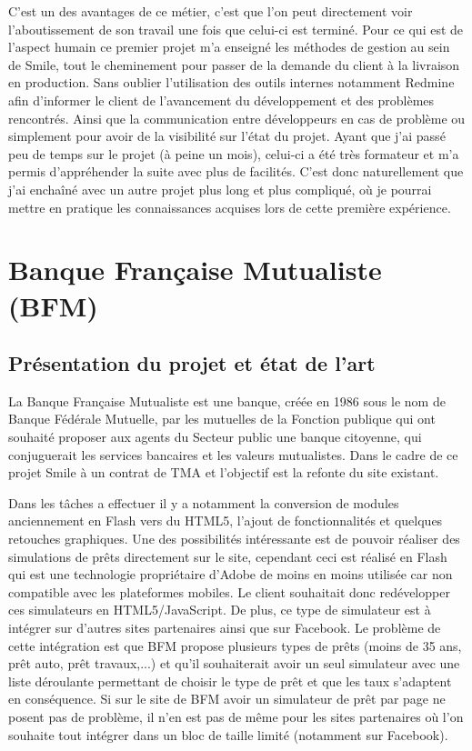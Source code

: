 \documentclass[a4paper,11pt,twoside]{report}
\begin{document}
    C'est un des avantages de ce métier, c'est que l'on peut directement voir l'aboutissement de son travail une fois que celui-ci est terminé. Pour ce qui est de l'aspect humain ce premier projet m'a enseigné les méthodes de gestion au sein de Smile, tout le cheminement pour passer de la demande du client à la livraison en production. Sans oublier l'utilisation des outils internes notamment Redmine afin d'informer le client de l'avancement du développement et des problèmes rencontrés. Ainsi que la communication entre développeurs en cas de problème ou simplement pour avoir de la visibilité sur l'état du projet. Ayant que j'ai passé peu de temps sur le projet (à peine un mois), celui-ci a été très formateur et m'a permis d'appréhender la suite avec plus de facilités. C'est donc naturellement que j'ai enchaîné avec un autre projet plus long et plus compliqué, où je pourrai mettre en pratique les connaissances acquises lors de cette première expérience.  
    
\newpage
    
  \section{Banque Française Mutualiste (BFM)}
    \subsection*{Présentation du projet et état de l'art}
    La Banque Française Mutualiste est une banque, créée en 1986 sous le nom de Banque Fédérale Mutuelle, par les mutuelles de la Fonction publique qui ont souhaité proposer aux agents du Secteur public une banque citoyenne, qui conjuguerait les services bancaires et les valeurs mutualistes. Dans le cadre de ce projet Smile à un contrat de TMA et l'objectif est la refonte du site existant. 
    
    Dans les tâches a effectuer il y a notamment la conversion de modules anciennement en Flash vers du HTML5, l'ajout de fonctionnalités et quelques retouches graphiques. Une des possibilités intéressante est de pouvoir réaliser des simulations de prêts directement sur le site, cependant ceci est réalisé en Flash qui est une technologie propriétaire d'Adobe de moins en moins utilisée car non compatible avec les plateformes mobiles. Le client souhaitait donc redévelopper ces simulateurs en HTML5/JavaScript. De plus, ce type de simulateur est à intégrer sur d'autres sites partenaires ainsi que sur Facebook. Le problème de cette intégration est que BFM propose plusieurs types de prêts (moins de 35 ans, prêt auto, prêt travaux,...) et qu'il souhaiterait avoir un seul simulateur avec une liste déroulante permettant de choisir le type de prêt et que les taux s'adaptent en conséquence. Si sur le site de BFM avoir un simulateur de prêt par page ne posent pas de problème, il n'en est pas de même pour les sites partenaires où l'on souhaite tout intégrer dans un bloc de taille limité (notamment sur Facebook). 
    
\end{document}

